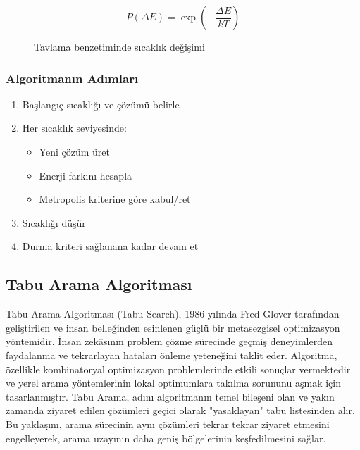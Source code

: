 \begin{equation}
P(\Delta E) = \exp\left(-\frac{\Delta E}{kT}\right)
\end{equation}

\begin{figure}[h]
\centering
{}
\caption{Tavlama benzetiminde sıcaklık değişimi}
\label{fig:sa_temp}
\end{figure}

\subsubsection{Algoritmanın Adımları}
\begin{enumerate}
    \item Başlangıç sıcaklığı ve çözümü belirle
    \item Her sıcaklık seviyesinde:
        \begin{itemize}
            \item Yeni çözüm üret
            \item Enerji farkını hesapla
            \item Metropolis kriterine göre kabul/ret
        \end{itemize}
    \item Sıcaklığı düşür
    \item Durma kriteri sağlanana kadar devam et
\end{enumerate}



\subsection{Tabu Arama Algoritması}
Tabu Arama Algoritması (Tabu Search), 1986 yılında Fred Glover tarafından geliştirilen ve insan belleğinden esinlenen güçlü bir metasezgisel optimizasyon yöntemidir. İnsan zekâsının problem çözme sürecinde geçmiş deneyimlerden faydalanma ve tekrarlayan hataları önleme yeteneğini taklit eder. Algoritma, özellikle kombinatoryal optimizasyon problemlerinde etkili sonuçlar vermektedir ve yerel arama yöntemlerinin lokal optimumlara takılma sorununu aşmak için tasarlanmıştır. Tabu Arama, adını algoritmanın temel bileşeni olan ve yakın zamanda ziyaret edilen çözümleri geçici olarak "yasaklayan" tabu listesinden alır. Bu yaklaşım, arama sürecinin aynı çözümleri tekrar tekrar ziyaret etmesini engelleyerek, arama uzayının daha geniş bölgelerinin keşfedilmesini sağlar.

